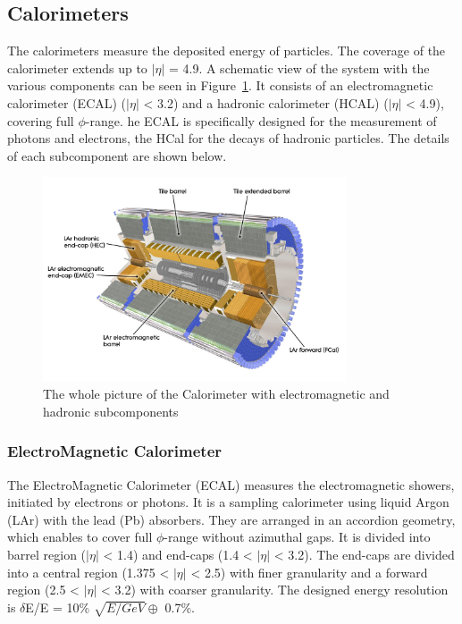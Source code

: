 \subsection{Calorimeters}
The calorimeters measure the deposited energy of particles. 
The coverage of the calorimeter extends up to $|\eta|$ = 4.9. A schematic view of the system with the various components can be seen in Figure~\ref{fig:calo}.
It consists of an electromagnetic calorimeter (ECAL) ($|\eta|$ < 3.2) and a hadronic calorimeter (HCAL)  ($|\eta|$ < 4.9), covering full $\phi$-range. he ECAL is specifically designed for the measurement of photons and electrons, the HCal for the decays of hadronic particles. The details of each subcomponent are shown below.

\begin{figure}[tbp]
\begin{center}
 \includegraphics[width=0.8\textwidth,keepaspectratio]{figures/detector/Calo}
\caption{
The whole picture of the Calorimeter with electromagnetic and hadronic subcomponents
}
\label{fig:calo}
\end{center}
\end{figure}


\subsubsection{ElectroMagnetic Calorimeter}
The ElectroMagnetic Calorimeter (ECAL) measures the electromagnetic showers, initiated by electrons or photons. It is a sampling calorimeter using liquid Argon (LAr) with the lead (Pb) absorbers. They are arranged in an accordion geometry, which enables to cover full $\phi$-range without azimuthal gaps. It is divided into barrel region ($|\eta|$ < 1.4) and end-caps (1.4 < $|\eta|$ < 3.2). The end-caps are divided into a central region (1.375 < $|\eta|$ < 2.5) with finer granularity and a forward region (2.5 < $|\eta|$ < 3.2) with coarser granularity. The designed energy resolution is $\delta$E/E = 10\% $\sqrt{E/GeV} \oplus$ 0.7\%.

